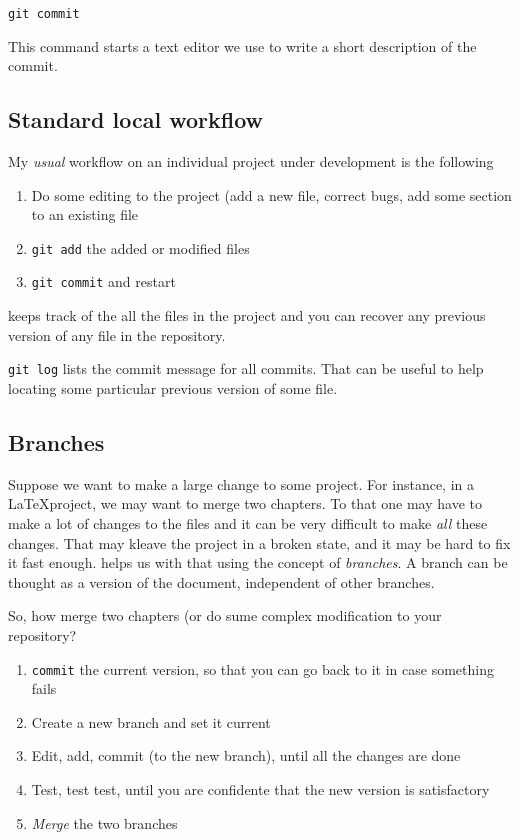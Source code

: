 \texttt{git commit}

This command starts a text editor we use to write a short description of the
commit.

\subsection{Standard local workflow}
My \emph{usual} \git workflow on an individual project under development is the
following\nopagebreak
\begin{enumerate}
  \item Do some editing to the project (add a new file, correct bugs, add some
    section to an existing file
  \item \texttt{git add} the added or modified files
  \item \texttt{git commit} and restart
\end{enumerate}

\git{} keeps track of the all the files in the project and you can recover any
previous version of any file in the repository.

\texttt{git log} lists the commit message for all commits. That can be useful to
help locating some particular previous version of some file.

\subsection{Branches}
Suppose we want to make a large change to some project. For instance, in a
\LaTeX project, we may want to merge two chapters. To that one may have to make
a lot of changes to the files and it can be very difficult to make \emph{all}
these changes. That may kleave the project in a broken state, and it may be hard
to fix it fast enough. \git{} helps us with that using the concept of
\emph{branches}. A branch can be thought as a version of the document,
independent of other branches. 

So, how merge two chapters (or do sume complex modification to your repository?
\begin{enumerate}
  \item \texttt{commit} the current version, so that you can go back to it in
    case something fails
  \item Create a new branch and set it current
  \item Edit, add, commit (to the new branch), until all the changes are done
  \item Test, test test, until you are confidente that the new version is
    satisfactory
  \item \emph{Merge} the two branches
\end{enumerate}

